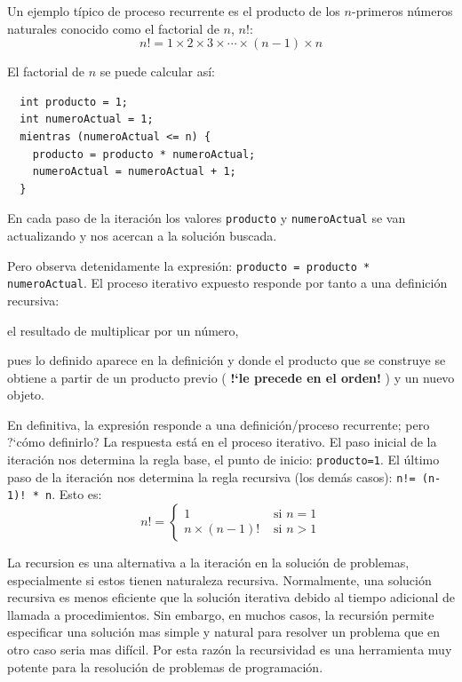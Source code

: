 \vspace{0.5cm}
\begin{ejemplo}
 Un ejemplo típico de proceso recurrente es el producto de los $n$-primeros números naturales conocido como el factorial de $n$, $n!$:
$$
n!=1\times 2 \times 3 \times \cdots \times (n-1) \times n
$$

\;

El factorial de $n$ se puede calcular así:
\begin{Verbatim}
  int producto = 1;
  int numeroActual = 1;
  mientras (numeroActual <= n) {
    producto = producto * numeroActual;
    numeroActual = numeroActual + 1;
  }
\end{Verbatim}
En cada paso de la iteración los valores {\tt producto} y {\tt numeroActual} se van actualizando y nos acercan a la solución buscada.

Pero observa detenidamente la expresión:  {\tt producto = producto * numeroActual}. 
El proceso iterativo expuesto responde por tanto a una definición recursiva:

\centerline{ el resultado de multiplicar  por un número,}

\noindent  pues lo definido aparece en la definición y donde el producto que se construye se obtiene a partir de un producto previo ( {\bf !`le precede en el orden!} ) y un nuevo objeto. 

En definitiva, la expresión responde a una definición/proceso recurrente; pero ?`cómo definirlo?
La respuesta está en el proceso iterativo.
El paso inicial de la iteración nos determina la regla base, el punto de inicio: {\tt producto=1}. El último paso de la iteración nos determina la regla recursiva (los demás casos): {\tt n!= (n-1)! * n}. Esto es:
$$
n!=\left\{
\begin{array}{ll}
1 & \mbox{ si } n=1 \\
n\times (n-1)!  & \mbox{ si } n>1 
\end{array}
\right.
$$
\end{ejemplo}

La recursion es una alternativa a la iteración en la solución de problemas, especialmente si estos tienen naturaleza recursiva.
Normalmente, una solución recursiva es menos eficiente que la solución iterativa debido al tiempo adicional de llamada a procedimientos. Sin embargo, 
en muchos casos, la recursión permite especificar una solución mas simple y natural para resolver un problema que en otro caso seria mas difícil. Por esta razón la recursividad es una herramienta muy potente para la resolución de problemas de programación.


